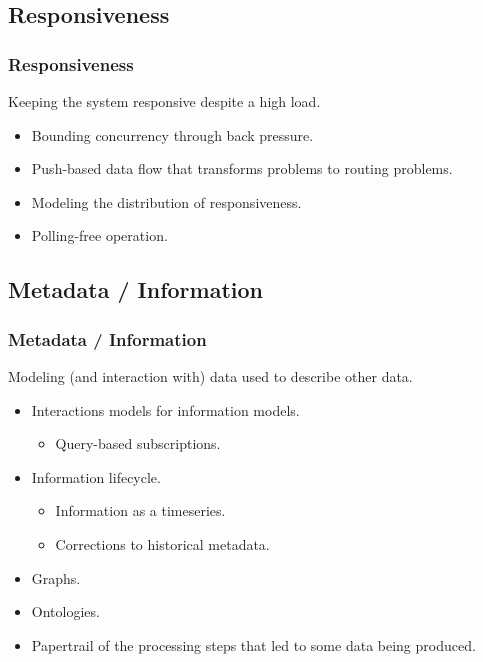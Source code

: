 \subsection{Responsiveness}
\begin{frame}
  \frametitle{Responsiveness}
  \vspace{3mm}
  Keeping the system responsive despite a high load.
  \vspace{5mm}
  \begin{itemize}
    \item Bounding concurrency through back pressure.
    \item Push-based data flow that transforms problems to routing problems.
    \item Modeling the distribution of responsiveness.
    \item Polling-free operation.
  \end{itemize}
\end{frame}

\subsection{Metadata / Information}
\begin{frame}
  \frametitle{Metadata / Information}
  \vspace{0mm}
  Modeling (and interaction with) data used to describe other data.
  \vspace{2mm}
  \begin{itemize}
     The decision of \textsl{how} parts of a query against an information model are resolved can be taken dynamically, and be implemented by arbitrary logic. This can take physical state into account, or extend the set of available physical sensors (from the model) with virtual sensors that are spun up on demand.
    \item Interactions models for information models.
      \begin{itemize}
        \item Query-based subscriptions.
      \end{itemize}
    \item Information lifecycle.
      \begin{itemize}
        \item Information as a timeseries.
        \item Corrections to historical metadata.
      \end{itemize}
    \item Graphs.
    \item Ontologies.
    \item Papertrail of the processing steps that led to some data being produced.
  \end{itemize}
\end{frame}

